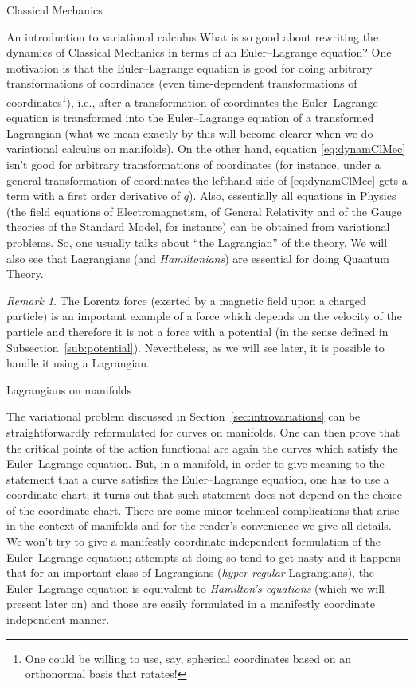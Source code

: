 \documentclass[oneside,a4paper,11pt]{amsbook}
\theoremstyle{remark}\newtheorem{exercise}{Exercise}[chapter]
\theoremstyle{plain}\newtheorem{teo}{Theorem}[section]
\theoremstyle{plain}\newtheorem{lem}[teo]{Lemma}
\theoremstyle{plain}\newtheorem{prop}[teo]{Proposition}
\theoremstyle{plain}\newtheorem{cor}[teo]{Corollary}
\theoremstyle{definition}\newtheorem{defin}[teo]{Definition}
\theoremstyle{remark}\newtheorem{rem}[teo]{Remark}
\theoremstyle{definition}\newtheorem{notation}[teo]{Notation}
\theoremstyle{definition}\newtheorem{convention}[teo]{Convention}
\theoremstyle{definition}\newtheorem{example}[teo]{Example}
\numberwithin{section}{chapter}
\numberwithin{equation}{section}
\begin{document}
\begin{chapter}{Classical Mechanics}
\begin{section}{An introduction to variational calculus}
What is so good about rewriting the dynamics of Classical Mechanics in terms of an Euler--Lagrange equation?
One motivation is that the Euler--Lagrange equation is good for doing arbitrary transformations of coordinates
(even time-dependent transformations of coordinates\footnote{%
One could be willing to use, say, spherical coordinates based on an orthonormal basis that
rotates!}), i.e., after a transformation of coordinates the Euler--Lagrange equation is transformed into
the Euler--Lagrange equation of a transformed Lagrangian (what we mean exactly by this will become clearer when we do
variational calculus on manifolds). On the other hand, equation \eqref{eq:dynamClMec} isn't good for
arbitrary transformations of coordinates (for instance, under a general transformation of coordinates
the lefthand side of \eqref{eq:dynamClMec} gets a term with a first order derivative of $q$).
Also, essentially all equations in Physics (the field equations of Electromagnetism, of General Relativity and
of the Gauge theories of the Standard Model, for instance) can be obtained from variational problems. So, one usually talks
about ``the Lagrangian'' of the theory. We will also see that Lagrangians (and {\em Hamiltonians}) are essential for
doing Quantum Theory.

\begin{rem}
The Lorentz force (exerted by a magnetic field upon a charged particle) is an important example of a force
which depends on the velocity of the particle and therefore it is not a force with a potential (in the
sense defined in Subsection~\ref{sub:potential}). Nevertheless, as we will see later, it is possible to handle it using
a Lagrangian.
\end{rem}

\end{section}

\begin{section}{Lagrangians on manifolds}
\label{sec:Lagrmanifolds}

The variational problem discussed in Section~\ref{sec:introvariations} can be straightforwardly reformulated for curves
on manifolds. One can then prove that the critical points of the action functional are again the curves which satisfy
the Euler--Lagrange equation. But, in a manifold, in order to give meaning to the statement that a curve satisfies
the Euler--Lagrange equation, one has to use a coordinate chart; it turns out that such statement does not
depend on the choice of the coordinate chart. There are some minor technical complications that arise in the context
of manifolds and for the reader's convenience we give all details. We won't try to give a manifestly coordinate independent
formulation of the Euler--Lagrange equation; attempts at doing so tend to get nasty and it happens that for an important
class of Lagrangians ({\em hyper-regular\/} Lagrangians), the Euler--Lagrange equation is equivalent to {\em Hamilton's equations\/}
(which we will present later on) and those are easily formulated in a manifestly coordinate independent manner.


\end{section}
\end{chapter}
\end{document}
